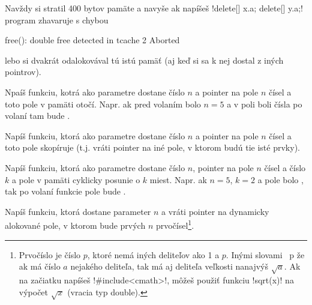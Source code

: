 
Navždy si stratil 400 bytov pamäte a navyše ak napíšeš \prg!delete[] x.a; delete[] y.a;!
program zhavaruje s chybou

\begin{outputBox}
free(): double free detected in tcache 2
Aborted
\end{outputBox}

lebo si dvakrát odalokovával tú istú pamäť (aj keď si sa k nej dostal z iných pointrov).

\begin{uloha}
  Npaíš funkciu, kotrá ako parametre dostane číslo $n$ a pointer na  pole $n$
  čísel a toto pole v pamäti otočí. Napr. ak pred volaním bolo $n=5$
  a v poli boli čísla  po volaní tam bude .
\end{uloha}

\begin{uloha}
  \label{uloha:arraycopy}
  Napíš funkciu, ktorá ako parametre dostane číslo $n$ a pointer na pole $n$
  čísel a toto pole skopíruje (t.j. vráti pointer na iné pole, v ktorom budú
  tie isté prvky).
\end{uloha}

\begin{uloha}
  Napíš funkciu, ktorá ako parametre dostane číslo $n$, pointer na  pole $n$
  čísel a číslo $k$ a pole v pamäti cyklicky posunie o $k$ miest.
  Napr. ak $n=5$, $k=2$ a pole bolo , tak po volaní funkcie
  pole bude .
\end{uloha}

\begin{uloha}
  \label{uloha:primetest}
  Napíš funkciu, ktorá dostane parameter $n$ a vráti pointer na dynamicky alokované
  pole, v ktorom bude prvých $n$ prvočísel\footnote{%
    Prvočíslo je číslo $p$, ktoré nemá iných deliteľov ako 1 a $p$. Inými slovami
    \prg~p%
    že ak má číslo $a$ nejakého deliteľa, tak má aj deliteľa veľkosti 
    nanajvýš $\sqrt{a}$. Ak na začiatku napíšeš \prg!#include<cmath>!, môžeš
    použiť funkciu \prg!sqrt(x)! na výpočet $\sqrt{x}$ (vracia typ double).
    }.
\end{uloha}

